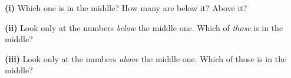 \documentclass[12pt]{article}
\begin{document}
\begin{enumerate}[leftmargin=1.9em, itemsep=0.40in]
        \textbf{(i)} Which one is in the middle?  \quad
        How many are below it?  \quad Above it? 
        \vspace{12pt}

        \textbf{(ii)} Look only at the numbers \emph{below} the middle one. Which of
        \emph{those} is in the middle? 
        \vspace{12pt}

        \textbf{(iii)} Look only at the numbers \emph{above} the middle one. Which of those
        is in the middle? 

\end{enumerate}
\end{document}

